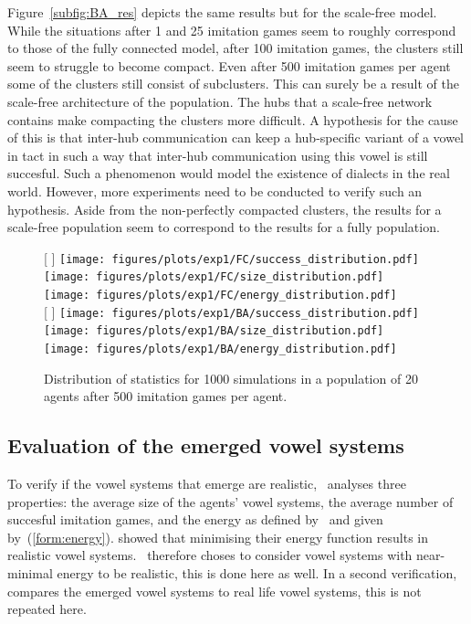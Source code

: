 \documentclass{article}
\begin{document}
Figure~\ref{subfig:BA_res} depicts the same results but for the scale-free model.
While the situations after 1 and 25 imitation games seem to roughly correspond to those of the fully connected model, after 100 imitation games, the clusters still seem
to struggle to become compact. Even after 500 imitation games per agent some of the clusters still consist of subclusters.
This can surely be a result of the scale-free architecture of the population.
The hubs that a scale-free network contains make compacting the clusters more difficult.
A hypothesis for the cause of this is that inter-hub communication can keep a hub-specific variant of a vowel in tact in such a way that inter-hub
communication using this vowel is still succesful. Such a phenomenon would model the existence of dialects in the real world.
However, more experiments need to be conducted to verify such an hypothesis.
Aside from the non-perfectly compacted clusters, the results for a scale-free population seem to correspond to the results for a fully population.

\begin{figure}[t]
    \centering
    [%
        \textwidth %
    ]%
    {%
        \texttt{[image: figures/plots/exp1/FC/success\_distribution.pdf]}
        \hfill
        \texttt{[image: figures/plots/exp1/FC/size\_distribution.pdf]}
        \hfill
        \texttt{[image: figures/plots/exp1/FC/energy\_distribution.pdf]}
    }%
    \\\bigskip
    [%
        \textwidth %
    ]%
    {%
        \texttt{[image: figures/plots/exp1/BA/success\_distribution.pdf]}
        \hfill
        \texttt{[image: figures/plots/exp1/BA/size\_distribution.pdf]}
        \hfill
        \texttt{[image: figures/plots/exp1/BA/energy\_distribution.pdf]}
    }
    \caption{Distribution of statistics for 1000 simulations in a population of 20 agents after 500 imitation games
        per agent.}
    \label{fig:stats}
\end{figure}

\subsection{Evaluation of the emerged vowel systems}
To verify if the vowel systems that emerge are realistic,~ analyses three properties: the average size of the agents'
vowel systems, the average number of succesful imitation games, and the energy as defined by~ and given by~(\ref{form:energy}).
 showed that minimising their energy function results in realistic vowel systems.~
therefore choses to consider vowel systems with near-minimal energy to be realistic, this is done here as well.
In a second verification,~ compares the emerged vowel systems to real life vowel systems, this is not repeated here.
\end{document}
